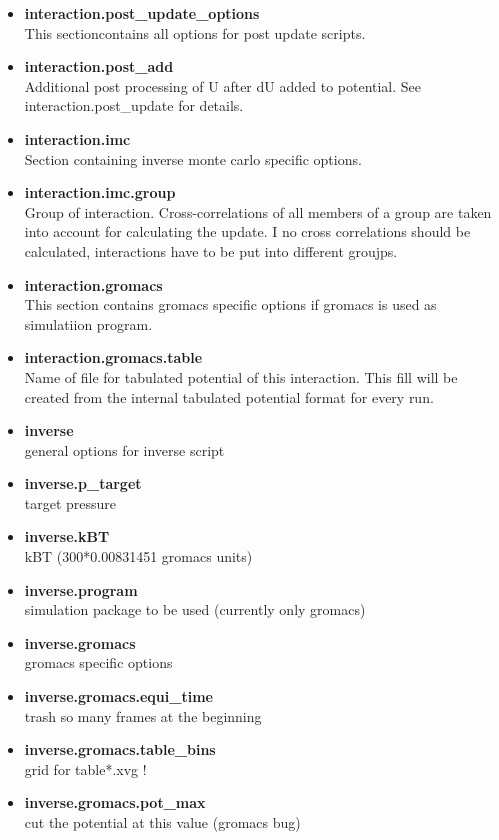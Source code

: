 \begin{itemize}
\item \textbf{interaction.post\_update\_options} \\
This sectioncontains all options for post update scripts.
\item \textbf{interaction.post\_add} \\
Additional post processing of U after dU added to potential. See interaction.post\_update for details.
\item \textbf{interaction.imc} \\
Section containing inverse monte carlo specific options.
\item \textbf{interaction.imc.group} \\
      Group of interaction. Cross-correlations of all members of a group are taken into account for calculating the update.
        I no cross correlations should be calculated, interactions have to be put into different groujps.
\item \textbf{interaction.gromacs} \\
        This section contains gromacs specific options if gromacs is used as simulatiion program.
\item \textbf{interaction.gromacs.table} \\
      Name of file for tabulated potential of this interaction. This fill will be created from the internal tabulated potential format for every run.
\item \textbf{inverse} \\
 general options for inverse script 
\item \textbf{inverse.p\_target} \\
 target pressure 
\item \textbf{inverse.kBT} \\
 kBT (300*0.00831451 gromacs units) 
\item \textbf{inverse.program} \\
simulation package to be used (currently only gromacs) 
\item \textbf{inverse.gromacs} \\
 gromacs specific options 
\item \textbf{inverse.gromacs.equi\_time} \\
 trash so many frames at the beginning 
\item \textbf{inverse.gromacs.table\_bins} \\
 grid for table*.xvg !
\item \textbf{inverse.gromacs.pot\_max} \\
 cut the potential at this value (gromacs bug) 

\end{itemize}
